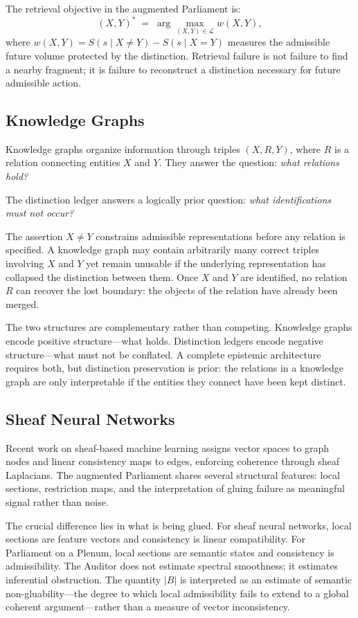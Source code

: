 \documentclass[12pt, a4paper]{article}
\theoremstyle{plain}
\theoremstyle{definition}
\theoremstyle{remark}
\begin{document}
The retrieval objective in the augmented Parliament is:
\[
(X,Y)^* \;=\; \arg\max_{(X,Y) \in \mathcal{L}} w(X,Y),
\]
where $w(X,Y) = S(s \mid X \neq Y) - S(s \mid X = Y)$ measures the admissible future volume protected by the distinction. Retrieval failure is not failure to find a nearby fragment; it is failure to reconstruct a distinction necessary for future admissible action.

\subsection{Knowledge Graphs}

Knowledge graphs organize information through triples $(X, R, Y)$, where $R$ is a relation connecting entities $X$ and $Y$. They answer the question: \emph{what relations hold?}

The distinction ledger answers a logically prior question: \emph{what identifications must not occur?}

The assertion $X \neq Y$ constrains admissible representations before any relation is specified. A knowledge graph may contain arbitrarily many correct triples involving $X$ and $Y$ yet remain unusable if the underlying representation has collapsed the distinction between them. Once $X$ and $Y$ are identified, no relation $R$ can recover the lost boundary: the objects of the relation have already been merged.

The two structures are complementary rather than competing. Knowledge graphs encode positive structure---what holds. Distinction ledgers encode negative structure---what must not be conflated. A complete epistemic architecture requires both, but distinction preservation is prior: the relations in a knowledge graph are only interpretable if the entities they connect have been kept distinct.

\subsection{Sheaf Neural Networks}

Recent work on sheaf-based machine learning \cite{kashiwara1990} assigns vector spaces to graph nodes and linear consistency maps to edges, enforcing coherence through sheaf Laplacians. The augmented Parliament shares several structural features: local sections, restriction maps, and the interpretation of gluing failure as meaningful signal rather than noise.

The crucial difference lies in what is being glued. For sheaf neural networks, local sections are feature vectors and consistency is linear compatibility. For Parliament on a Plenum, local sections are semantic states and consistency is admissibility. The Auditor does not estimate spectral smoothness; it estimates inferential obstruction. The quantity $|B|$ is interpreted as an estimate of semantic non-gluability---the degree to which local admissibility fails to extend to a global coherent argument---rather than a measure of vector inconsistency.
\end{document}

